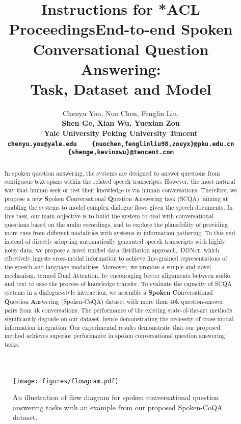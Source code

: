 \documentclass[11pt]{article}
\title{Instructions for *ACL Proceedings}
\title{End-to-end Spoken Conversational Question Answering: \\ Task, Dataset and Model}
\author{Chenyu You, Nuo Chen, Fenglin Liu, \\ \bf{Shen Ge,} Xian Wu, Yuexian Zou \\ \textit{}
Yale University Peking University Tencent \\
  \texttt{chenyu.you@yale.edu}~~~ \texttt{\{nuochen,fenglinliu98,zouyx\}@pku.edu.cn} \\ \texttt{\{shenge,kevinxwu\}@tencent.com} \\
}
\begin{document}
\maketitle
\renewcommand{\thefootnote}{\fnsymbol{footnote}}
\renewcommand{\thefootnote}{\arabic{footnote}}


\begin{abstract}
In spoken question answering, the systems are designed to answer questions from contiguous text spans within the related speech transcripts. However, the most natural way that human seek or test their knowledge is via human conversations. Therefore, we propose a new \textbf{S}poken \textbf{C}onversational \textbf{Q}uestion \textbf{A}nswering task (SCQA), aiming at enabling the systems to model complex dialogue flows given the speech documents. In this task, our main objective is to build the system to deal with conversational questions based on the audio recordings, and to explore the plausibility of providing more cues from different modalities with systems in information gathering. To this end, instead of directly adopting automatically generated speech transcripts with highly noisy data, we propose a novel unified data distillation approach,~\textsc{DDNet}, which effectively ingests cross-modal information to achieve fine-grained representations of the speech and language modalities. Moreover, we propose a simple and novel mechanism, termed Dual Attention, by encouraging better alignments between audio and text to ease the process of knowledge transfer. To evaluate the capacity of SCQA systems in a dialogue-style interaction, we assemble a \textbf{Spoken} \textbf{Co}nversational \textbf{Q}uestion \textbf{A}nswering (Spoken-CoQA) dataset with more than 40k question-answer pairs from 4k conversations. The performance of the existing state-of-the-art methods significantly degrade on our dataset, hence demonstrating the necessity of cross-modal information integration. Our experimental results demonstrate that our proposed method achieves superior performance in spoken conversational question answering tasks.
\end{abstract} 
\begin{figure*}
\begin{center}
\texttt{[image: figures/flowgram.pdf]} \end{center}
\vspace{-10pt}
\caption{An illustration of flow diagram for spoken conversational question answering tasks with an example from our proposed Spoken-CoQA dataset.}
\label{fig:framework}
\vspace{-5pt}
\end{figure*}
\end{document}
